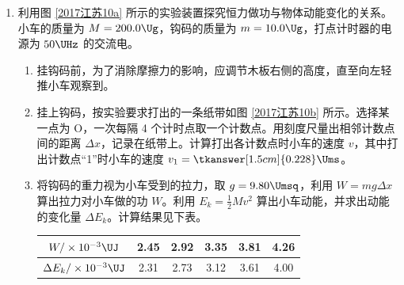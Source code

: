 \documentclass[\gkver]{gaokaozhenti}
\begin{document}
\begin{enumerate}

\item
利用图 \ref{2017江苏10a} 所示的实验装置探究恒力做功与物体动能变化的关系。小车的质量为 $M = 200.0\Ug$，钩码的质量为 $m = 10.0\Ug$，打点计时器的电源为 $50\UHz$ 的交流电。


\begin{enumerate}
	\item
	挂钩码前，为了消除摩擦力的影响，应调节木板右侧的高度，直至向左轻推小车观察到。
	\item
	挂上钩码，按实验要求打出的一条纸带如图 \ref{2017江苏10b} 所示。选择某一点为 O，一次每隔 4 个计时点取一个计数点。用刻度尺量出相邻计数点间的距离 $\Delta x$，记录在纸带上。计算打出各计数点时小车的速度 $v$，其中打出计数点“1”时小车的速度 $v_{1} = \tkanswer[1.5cm]{0.228}\Ums$。


	\item
	将钩码的重力视为小车受到的拉力，取 $g = 9.80\Umsq$，利用 $W = mg\Delta x$ 算出拉力对小车做的功 $W$。利用 $E_{k} = \frac{1}{2}Mv^{2}$ 算出小车动能，并求出动能的变化量 $\Delta E_{k}$。计算结果见下表。

	\begin{center}
	\begin{tabular}{|c|c|c|c|c|c|}
	\hline
	$W/\times10^{-3}\UJ$ & 2.45 & 2.92 & 3.35 & 3.81 & 4.26 \\
	\hline
	$\Delta E_{k}/\times10^{-3}\UJ$ & 2.31 & 2.73 & 3.12 & 3.61 & 4.00 \\
	\hline
	\end{tabular}
	\end{center}


\end{enumerate}
\end{enumerate}
\end{document}
